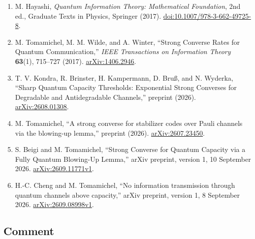\begin{enumerate}[label={},leftmargin=4.8em,labelsep=0.5em]
  \footnotesize
  \item[\textup{[Hay17]}]\label{ref:h13-book}
  M. Hayashi, \emph{Quantum Information Theory: Mathematical Foundation}, 2nd ed., Graduate Texts in Physics, Springer (2017). \href{https://doi.org/10.1007/978-3-662-49725-8}{doi:10.1007/978-3-662-49725-8}.

  \item[\textup{[TWW17]}]\label{ref:h13-tww}
  M. Tomamichel, M. M. Wilde, and A. Winter, ``Strong Converse Rates for Quantum Communication,'' \emph{IEEE Transactions on Information Theory} \textbf{63}(1), 715--727 (2017). \href{https://arxiv.org/abs/1406.2946}{arXiv:1406.2946}.

  \item[\textup{[KBK+26]}]\label{ref:h13-kondra}
  T. V. Kondra, R. Brinster, H. Kampermann, D. Bru{\ss}, and N. Wyderka, ``Sharp Quantum Capacity Thresholds: Exponential Strong Converses for Degradable and Antidegradable Channels,'' preprint (2026). \href{https://arxiv.org/abs/2608.01308}{arXiv:2608.01308}.

  \item[\textup{[Tom26]}]\label{ref:h13-tomamichel}
  M. Tomamichel, ``A strong converse for stabilizer codes over Pauli channels via the blowing-up lemma,'' preprint (2026). \href{https://arxiv.org/abs/2607.23450}{arXiv:2607.23450}.

  \item[\textup{[BT26]}]\label{ref:h13-beigi-tomamichel}
  S. Beigi and M. Tomamichel, ``Strong Converse for Quantum Capacity via a Fully Quantum Blowing-Up Lemma,'' arXiv preprint, version 1, 10 September 2026. \href{https://arxiv.org/abs/2609.11771v1}{arXiv:2609.11771v1}.

  \item[\textup{[CT26]}]\label{ref:h13-cheng-tomamichel}
  H.-C. Cheng and M. Tomamichel, ``No information transmission through quantum channels above capacity,'' arXiv preprint, version 1, 8 September 2026. \href{https://arxiv.org/abs/2609.08998v1}{arXiv:2609.08998v1}.
\end{enumerate}

\subsection*{Comment}

